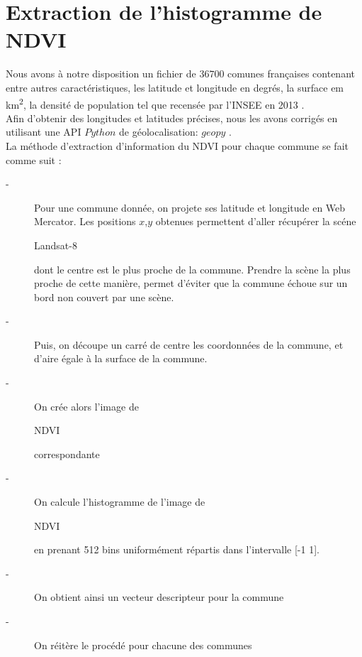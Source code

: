 \documentclass{book}
\begin{document}
\chapter{Extraction de l'histogramme de NDVI}

Nous avons à notre disposition un fichier de $36700$ comunes françaises contenant entre autres caractéristiques, les latitude et longitude en degrés,
la surface em km\textsuperscript{2}, la densité de population tel que recensée par l'INSEE en 2013 \cite{insee_pop2013}.\\
Afin d'obtenir des longitudes et latitudes précises, nous les avons corrigés en utilisant une API $Python$ de géolocalisation: $geopy$ \cite{geopy}.\\

La méthode d'extraction d'information du NDVI pour chaque commune se fait comme suit :
\begin{description}
\item[-] Pour une commune donnée, on projete ses latitude et longitude en Web Mercator. Les positions $x$,$y$ obtenues permettent d'aller récupérer 
la scéne \begin{itshape}Landsat-8\end{itshape} dont le centre est le plus proche de la commune. Prendre la scène la plus proche de cette manière,
permet d'éviter que la commune échoue sur un bord non couvert par une scène.
\item[-] Puis, on découpe un carré de centre les coordonnées de la  commune, et d'aire égale à la surface de la commune.
\item[-] On crée alors l'image de \begin{itshape}NDVI\end{itshape} correspondante
\item[-] On calcule l'histogramme de l'image de \begin{itshape}NDVI\end{itshape} en prenant 512 bins uniformément répartis dans l'intervalle [-1 1].
\item[-] On obtient ainsi un vecteur descripteur pour la commune
\item[-] On réitère le procédé pour chacune des communes
\end{description}
\end{document}

